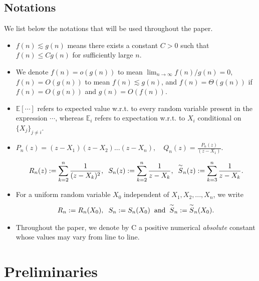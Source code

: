 \documentclass[9pt,a4paper,reqno]{amsart}
\newcommand{\tildea}[1]{\overset{\sim}{#1}}
\theoremstyle{mine}
\theoremstyle{definition}
\theoremstyle{remark}
\newcommand{\mb}{\mathbb}
\begin{document}
\subsection{Notations}\label{notations} 
We list below the notations that will be used throughout the paper.
\begin{itemize}
\item $f(n) \lesssim g(n)$ means there exists a constant $C>0$ such that $f(n) \le C g(n)$ for sufficiently large $n$.
\item We denote $f(n) = o(g(n))$ to mean $\lim_{n\to\infty} f(n)/g(n) = 0$, $f(n) = O(g(n))$ to mean $f(n) \lesssim g(n)$, and $f(n) = \Theta(g(n))$ if $f(n) = O(g(n))$ and $g(n) = O(f(n))$.
\item $\mb{E}[\cdots]$ refers to expected value w.r.t. to every random variable present in the expression $\cdots$, whereas $\mb{E}_{i}$ refers to expectation w.r.t. to $X_i$ 
conditional on $\{X_j\}_{j\neq i}$.

\item 
   $P_n(z) = (z-X_1)(z-X_2)...(z-X_n), \quad Q_n(z)= \frac{P_n(z)}{(z-X_1)}$.
   
\begin{align*}
     R_n(z) := \sum_{k=2}^n \frac{1}{(z-X_k)^2}, \hspace{2mm}S_n(z) := \sum_{k=2}^n \frac{1}{z-X_k}, \hspace{2mm}\tildea{S}_n(z) := \sum_{k=3}^n \frac{1}{z-X_k}. 
\end{align*}

\item For a uniform random variable $X_0$ independent of $X_1,X_2,...,X_n$, we write 
\begin{align*}
   R_n := R_n(X_0),  \textrm{\hspace{2mm}}  S_n := S_n(X_0)  \textrm{\hspace{2mm}and\hspace{2mm}} \tildea{S}_n := \tildea{S}_n(X_0). 
\end{align*}
\item Throughout the paper, we denote by C a positive numerical \emph{absolute} constant whose values may vary from line to line.
\end{itemize}  




 


\section{Preliminaries}
\end{document}
